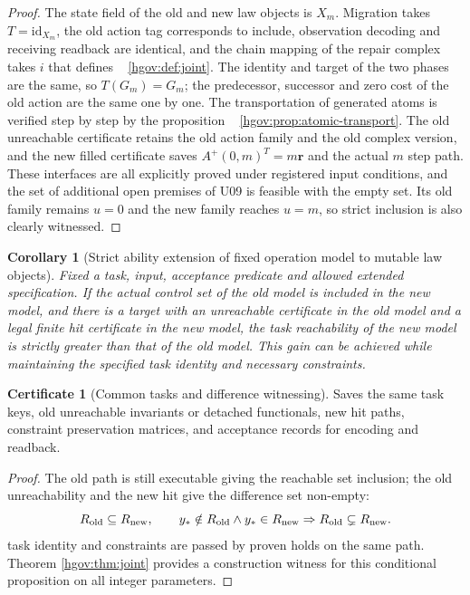 \documentclass[12pt,a4paper,openany,notitlepage]{report}
\theoremstyle{plain}
\newtheorem{corollary}[theorem]{Corollary}
\theoremstyle{definition}
\newtheorem*{certificate}{Certificate}
\theoremstyle{remark}
\def\mathcal#1{#1}\def\mathsf#1{#1}\def\mathbb#1{#1}%
\begin{document}
\begin{CJK*}
\begin{proof}
The state field of the old and new law objects is $X_m$. Migration takes $T=\mathrm{id}_{X_m}$, the old action tag corresponds to include, observation decoding and receiving readback are identical, and the chain mapping of the repair complex takes $i$ that defines ~ \ref{hgov:def:joint}. The identity and target of the two phases are the same, so $T(G_m)=G_m$; the predecessor, successor and zero cost of the old action are the same one by one. The transportation of generated atoms is verified step by step by the proposition ~ \ref{hgov:prop:atomic-transport}. The old unreachable certificate retains the old action family and the old complex version, and the new filled certificate saves $A^+(0,m)^{\mathsf T}=m\mathbf r$ and the actual $m$ step path. These interfaces are all explicitly proved under registered input conditions, and the set of additional open premises of U09 is feasible with the empty set. Its old family remains $u=0$ and the new family reaches $u=m$, so strict inclusion is also clearly witnessed.\end{proof}


\begin{corollary}
[Strict ability extension of fixed operation model to mutable law objects]\label{hgov:cor:value}
Fixed a task, input, acceptance predicate and allowed extended specification. If the actual control set of the old model is included in the new model, and there is a target with an unreachable certificate in the old model and a legal finite hit certificate in the new model, the task reachability of the new model is strictly greater than that of the old model. This gain can be achieved while maintaining the specified task identity and necessary constraints.\end{corollary}
\begin{certificate}
[Common tasks and difference witnessing]Saves the same task keys, old unreachable invariants or detached functionals, new hit paths, constraint preservation matrices, and acceptance records for encoding and readback.\end{certificate}
\begin{proof}
The old path is still executable giving the reachable set inclusion; the old unreachability and the new hit give the difference set non-empty: \[
\mathcal R_{\rm old}\subseteq\mathcal R_{\rm new},
\qquad
y_*\notin\mathcal R_{\rm old}\land y_*\in\mathcal R_{\rm new}
\Rightarrow
\mathcal R_{\rm old}\subsetneq\mathcal R_{\rm new}.
\] task identity and constraints are passed by proven holds on the same path. Theorem \ref{hgov:thm:joint} provides a construction witness for this conditional proposition on all integer parameters.\end{proof}



\end{CJK*}
\end{document}
